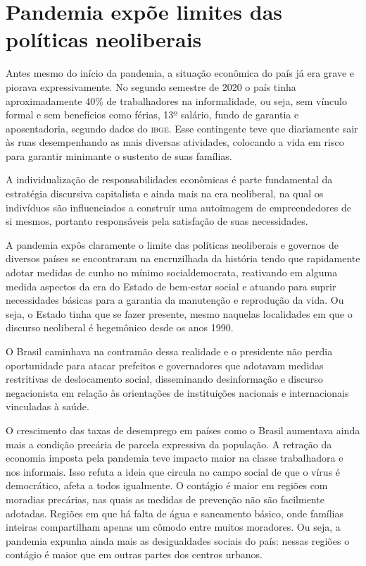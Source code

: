 \section{Pandemia expõe limites das políticas neoliberais}

Antes mesmo do início da pandemia, a situação econômica do país já era
grave e piorava expressivamente. No segundo semestre de 2020 o país
tinha aproximadamente 40\% de trabalhadores na informalidade, ou seja,
sem vínculo formal e sem benefícios como férias, 13º salário, fundo de
garantia e aposentadoria, segundo dados do \textsc{\textsc{ibge}}. Esse contingente teve que diariamente
sair às ruas desempenhando as mais diversas atividades, colocando a vida
em risco para garantir minimante o sustento de suas famílias.

A individualização de responsabilidades econômicas é parte fundamental
da estratégia discursiva capitalista e ainda mais na era neoliberal, na
qual os indivíduos são influenciados a construir uma autoimagem de
empreendedores de si mesmos, portanto responsáveis pela satisfação de
suas necessidades.

A pandemia expôs claramente o limite das políticas neoliberais e
governos de diversos países se encontraram na encruzilhada da história
tendo que rapidamente adotar medidas de cunho no mínimo socialdemocrata,
reativando em alguma medida aspectos da era do Estado de bem-estar
social e atuando para suprir necessidades básicas para a garantia da
manutenção e reprodução da vida. Ou seja, o Estado tinha que se fazer
presente, mesmo naquelas localidades em que o discurso neoliberal é
hegemônico desde os anos 1990.

O Brasil caminhava na contramão dessa realidade e o presidente não
perdia oportunidade para atacar prefeitos e governadores que adotavam
medidas restritivas de deslocamento social, disseminando desinformação e
discurso negacionista em relação às orientações de instituições
nacionais e internacionais vinculadas à saúde.

O crescimento das taxas de desemprego em países como o Brasil aumentava
ainda mais a condição precária de parcela expressiva da população. A
retração da economia imposta pela pandemia teve impacto maior na classe
trabalhadora e nos informais. Isso refuta a ideia que circula no campo
social de que o vírus é democrático, afeta a todos igualmente. O
contágio é maior em regiões com moradias precárias, nas quais as medidas
de prevenção não são facilmente adotadas. Regiões em que há falta de
água e saneamento básico, onde famílias inteiras compartilham apenas um
cômodo entre muitos moradores. Ou seja, a pandemia expunha ainda mais as
desigualdades sociais do país: nessas regiões o contágio é maior que em
outras partes dos centros urbanos.


